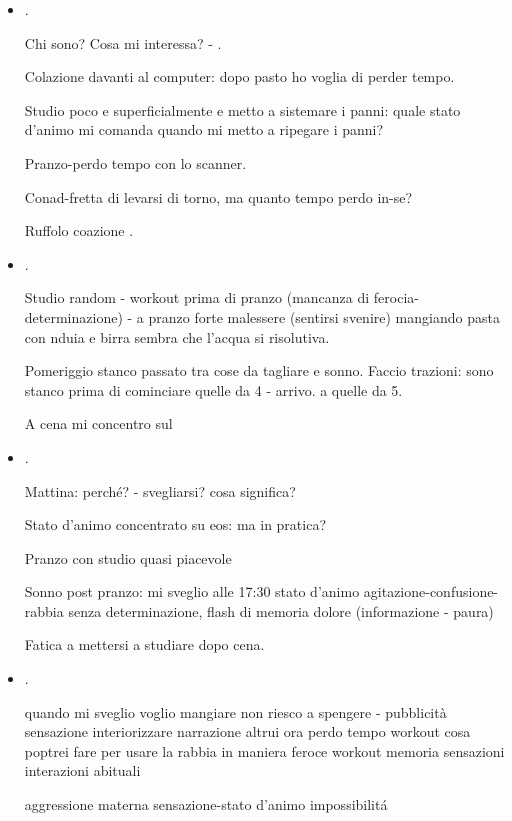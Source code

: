 \begin{itemize}
\item {}.

Chi sono? Cosa mi interessa? - .

Colazione davanti al computer: dopo pasto ho voglia di perder tempo.

Studio poco e superficialmente e metto a sistemare i panni: quale stato d'animo mi comanda quando mi metto a ripegare i panni?

Pranzo-perdo tempo con lo scanner.

Conad-fretta di levarsi di torno, ma quanto tempo perdo in-se?

Ruffolo coazione .

\item {}.

Studio random - workout prima di pranzo (mancanza di ferocia-determinazione) - a pranzo forte malessere (sentirsi svenire) mangiando pasta con nduia e birra sembra che l'acqua si risolutiva.

Pomeriggio stanco passato tra cose da tagliare e sonno. Faccio trazioni: sono stanco prima di cominciare quelle da 4 - arrivo. a quelle da 5.

A cena mi concentro sul 

\item {}.

Mattina: perch\'e? - svegliarsi? cosa significa?

Stato d'animo concentrato su eos: ma in pratica?

Pranzo con studio quasi piacevole

Sonno post pranzo: mi sveglio alle 17:30 stato d'animo agitazione-confusione-rabbia senza determinazione, flash di memoria dolore (informazione - paura)

Fatica a mettersi a studiare dopo cena.

\item {}.

quando mi sveglio voglio mangiare
non riesco a spengere - pubblicità 
sensazione interiorizzare narrazione altrui
ora perdo tempo
workout cosa poptrei fare per usare la rabbia in maniera feroce
workout memoria sensazioni interazioni abituali

aggressione materna sensazione-stato d'animo impossibilit\'a


\end{itemize}
